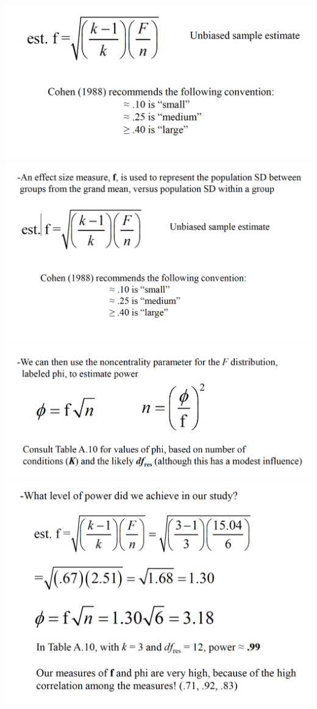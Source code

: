 \documentclass[]{book}
\theoremstyle{definition}
\theoremstyle{definition}
\theoremstyle{definition}
\theoremstyle{remark}
\begin{document}
\includegraphics{img/hicksrma15.png}
\includegraphics{img/hicksrma16.png}
\includegraphics{img/hicksrma17.png}
\includegraphics{img/hicksrma18.png}
\end{document}
